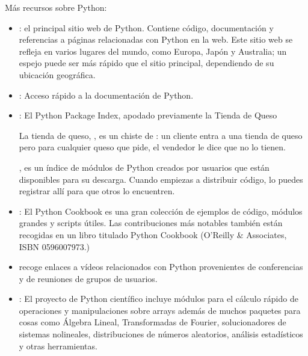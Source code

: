 \documentclass[a5paper,10pt,spanish]{sphinxmanual}
\begin{document}
\sphinxAtStartPar
Más recursos sobre Python:
\begin{itemize}
\item {} 
\sphinxAtStartPar
{}: el principal sitio web de Python. Contiene código, documentación y referencias a páginas relacionadas con Python en la web. Este sitio web se refleja en varios lugares del mundo, como Europa, Japón y Australia; un espejo puede ser más rápido que el sitio principal, dependiendo de su ubicación geográfica.

\item {} 
\sphinxAtStartPar
{}:  Acceso rápido a la documentación de Python.

\item {} 
\sphinxAtStartPar
{}: El Python Package Index, apodado previamente la Tienda de Queso %
\begin{footnote}[1]\sphinxAtStartFootnote
La tienda de queso, , es un chiste de : un cliente entra a una tienda de queso pero para cualquier queso que pide, el vendedor le dice que no lo tienen.
%
\end{footnote}, es un índice de módulos de Python creados por usuarios que están disponibles para su descarga. Cuando empiezas a distribuir código, lo puedes registrar allí para que otros lo encuentren.

\item {} 
\sphinxAtStartPar
{}: El Python Cookbook es una gran colección de ejemplos de código, módulos grandes y scripts útiles. Las contribuciones más notables también están recogidas en un libro titulado Python Cookbook (O’Reilly \& Associates, ISBN 0\sphinxhyphen{}596\sphinxhyphen{}00797\sphinxhyphen{}3.)

\item {} 
\sphinxAtStartPar
{} recoge enlaces a vídeos relacionados con Python provenientes de conferencias y de reuniones de grupos de usuarios.

\item {} 
\sphinxAtStartPar
{}: El proyecto de Python científico incluye módulos para el cálculo rápido de operaciones y manipulaciones sobre arrays además de muchos paquetes para cosas como Álgebra Lineal, Transformadas de Fourier, solucionadores de sistemas no\sphinxhyphen{}lineales, distribuciones de números aleatorios, análisis estadísticos y otras herramientas.

\end{itemize}
\end{document}
